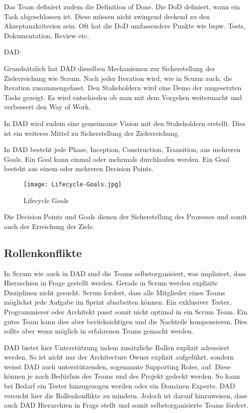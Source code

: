 Das Team definiert zudem die Definition of Done. Die DoD definiert, wann ein Task abgeschlossen ist. Diese müssen nicht zwingend deckend zu den Akzeptanzkriterien sein. Oft hat die DoD umfassendere Punkte wie bspw. Tests, Dokumentation, Review etc.

\medskip
{\Large DAD:} \medskip

Grundsätzlich hat DAD dieselben Mechanismen zur Sicherstellung der Zielerreichung wie Scrum. Nach jeder Iteration wird, wie in Scurm auch, die Iteration zusammengefasst. Den Stakeholdern wird eine Demo der umgesetzten Tasks gezeigt. Es wird entschieden ob man mit dem Vorgehen weitermacht und verbessert den Way of Work.

In DAD wird zudem eine gemeinsame Vision mit den Stakeholdern erstellt. Dies ist ein weiteres Mittel zu Sicherstellung der Zielerreichung.

In DAD besteht jede Phase, Inception, Construction, Transition, aus mehreren Goals. Ein Goal kann einmal oder mehrmals durchlaufen werden. Ein Goal besteht aus einem oder mehreren Decision Points.

\begin{figure}[H]
	\centering
	\texttt{[image: Lifecycle-Goals.jpg]}
	\caption{Lifecycle Goals}
	\label{fig:goals}
\end{figure}

Die Decision Points und Goals dienen der Sicherstellung des Prozesses und somit auch der Erreichung der Ziele.

\subsection{Rollenkonflikte}

In Scrum wie auch in DAD sind die Teams selbstorganisiert, was impliziert, dass Hierarchien in Frage gestellt werden. Gerade in Scrum werden explizite Disziplinen nicht gesucht. Scrum fordert, dass alle Mitglieder eines Teams möglichst jede Aufgabe im Sprint abarbeiten können. Ein exklusiver Tester, Programmierer oder Architekt passt somit nicht optimal in ein Scrum Team. Ein gutes Team kann dies aber berücksichtigen und die Nachteile kompensieren. Dies sollte aber wenn möglich in erfahrenen Teams gemacht werden.

DAD bietet hier Unterstützung indem zusätzliche Rollen explizit adressiert werden. So ist nicht nur der Architecture Owner explizit aufgeführt, sondern weisst DAD auch unterstützenden, sogenannte Supporting Roles, auf. Diese können je nach Bedürfnis des Teams und des Projekt gedeckt werden. So kann bei Bedarf ein Tester hinzugezogen werden oder ein Domänen Experte. DAD versucht hier die Rollenkonflikte zu mindern. Jedoch ist darauf hinzuweisen, dass auch DAD Hierarchien in Frage stellt und somit selbstorganisierte Teams fördert.




